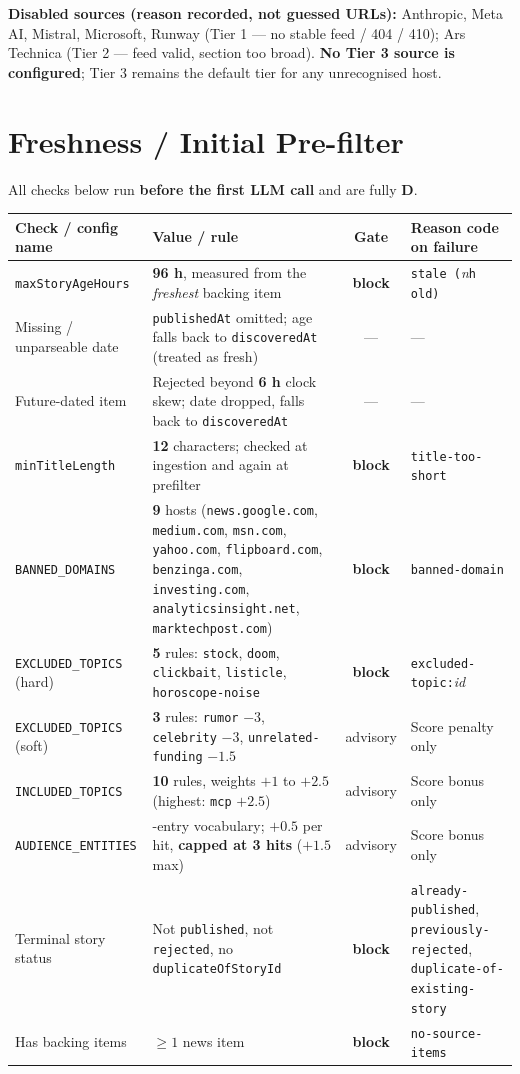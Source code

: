 \documentclass[10pt,a4paper]{article}
\newcommand{\cd}[1]{\texttt{\footnotesize\hyphenpenalty=0\exhyphenpenalty=0\relax #1}}
\newcommand{\us}{\_\discretionary{}{}{}}
\newcommand{\D}{\textcolor{go}{\textbf{D}}}
\newcommand{\BL}{\textcolor{st}{\textbf{block}}}
\newcommand{\AD}{\textcolor{hd}{advisory}}
\begin{document}
\textbf{Disabled sources (reason recorded, not guessed URLs):} Anthropic, Meta AI, Mistral, Microsoft, Runway (Tier 1 --- no stable feed / 404 / 410); Ars Technica (Tier 2 --- feed valid, section too broad). \textbf{No Tier 3 source is configured}; Tier 3 remains the default tier for any unrecognised host.

\section{Freshness / Initial Pre-filter}

All checks below run \textbf{before the first LLM call} and are fully \D.

\begin{center}\footnotesize
\begin{tabularx}{\textwidth}{@{}>{\RaggedRight}p{4.2cm} >{\RaggedRight}X c >{\RaggedRight}p{4.3cm}@{}}
\toprule
\textbf{Check / config name} & \textbf{Value / rule} & \textbf{Gate} & \textbf{Reason code on failure} \\
\midrule
\cd{maxStoryAgeHours} & \textbf{96 h}, measured from the \emph{freshest} backing item & \BL & \cd{stale (}\textit{n}\cd{h old)} \\
Missing / unparseable date & \cd{publishedAt} omitted; age falls back to \cd{discoveredAt} (treated as fresh) & --- & --- \\
Future-dated item & Rejected beyond \textbf{6 h} clock skew; date dropped, falls back to \cd{discoveredAt} & --- & --- \\
\cd{minTitleLength} & \textbf{12} characters; checked at ingestion and again at prefilter & \BL & \cd{title-too-short} \\
\cd{BANNED\us DOMAINS} & \textbf{9} hosts (\cd{news.google.com}, \cd{medium.com}, \cd{msn.com}, \cd{yahoo.com}, \cd{flipboard.com}, \cd{benzinga.com}, \cd{investing.com}, \cd{analyticsinsight.net}, \cd{marktechpost.com}) & \BL & \cd{banned-domain} \\
\cd{EXCLUDED\us TOPICS} (hard) & \textbf{5} rules: \cd{stock}, \cd{doom}, \cd{clickbait}, \cd{listicle}, \cd{horoscope-noise} & \BL & \cd{excluded-topic:}\textit{id} \\
\cd{EXCLUDED\us TOPICS} (soft) & \textbf{3} rules: \cd{rumor} $-3$, \cd{celebrity} $-3$, \cd{unrelated-funding} $-1.5$ & \AD & Score penalty only \\
\cd{INCLUDED\us TOPICS} & \textbf{10} rules, weights $+1$ to $+2.5$ (highest: \cd{mcp} $+2.5$) & \AD & Score bonus only \\
\cd{AUDIENCE\us ENTITIES} & 43-entry vocabulary; $+0.5$ per hit, \textbf{capped at 3 hits} ($+1.5$ max) & \AD & Score bonus only \\
Terminal story status & Not \cd{published}, not \cd{rejected}, no \cd{duplicateOfStoryId} & \BL & \cd{already-published}, \cd{previously-rejected}, \cd{duplicate-of-}\allowbreak\cd{existing-story} \\
Has backing items & $\geq 1$ news item & \BL & \cd{no-source-items} \\
\bottomrule
\end{tabularx}
\end{center}
\end{document}

